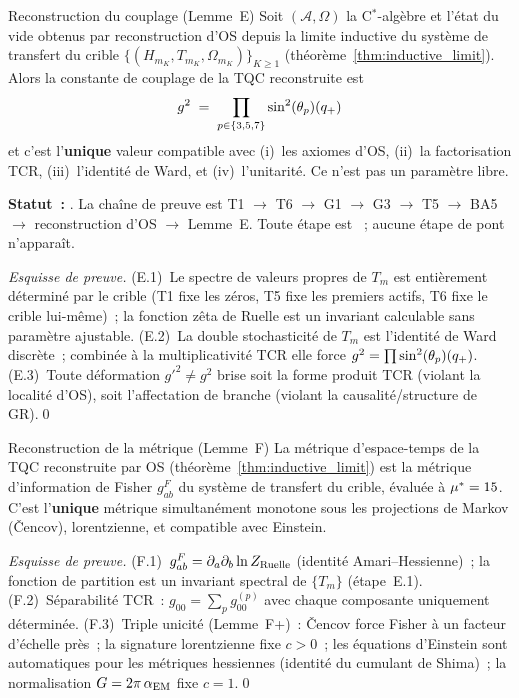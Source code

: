 \documentclass[12pt,a4paper]{article}
\begin{document}
\begin{thmbox}{Reconstruction du couplage (Lemme~E)}\mTHM
\label{thm:coupling_reconstruction}
Soit $(\mathcal{A}, \Omega)$ la C$^*$-algèbre et l'état du vide
obtenus par reconstruction d'OS depuis la limite inductive du
système de transfert du crible
$\{(H_{m_K}, T_{m_K}, \Omega_{m_K})\}_{K \geq 1}$
(théorème~\ref{thm:inductive_limit}). Alors la constante de couplage
de la TQC reconstruite est
\begin{equation}
  g^2 \;=\; \prod_{p \in \{3,5,7\}} \sin^2(\theta_{p})(q_{+})
  \label{eq:coupling_spectral}
\end{equation}
et c'est l'\textbf{unique} valeur compatible avec (i)~les axiomes
d'OS, (ii)~la factorisation TCR, (iii)~l'identité de Ward, et
(iv)~l'unitarité. Ce n'est pas un paramètre libre.

\smallskip\noindent\textbf{Statut~:} \THMTAG. La chaîne de preuve est
T1 $\to$ T6 $\to$ G1 $\to$ G3 $\to$ T5 $\to$ BA5 $\to$ reconstruction
d'OS $\to$ Lemme~E. Toute étape est \THMTAG~; aucune étape de pont
n'apparaît.
\end{thmbox}

\noindent\textit{Esquisse de preuve.}
(E.1)~Le spectre de valeurs propres de $T_m$ est entièrement
déterminé par le crible (T1 fixe les zéros, T5 fixe les premiers
actifs, T6 fixe le crible lui-même)~; la fonction zêta de Ruelle
est un invariant calculable sans paramètre ajustable.
(E.2)~La double stochasticité de $T_m$ est l'identité de Ward
discrète~; combinée à la multiplicativité TCR elle force
$g^2 = \prod \sin^2(\theta_{p})(q_{+})$.
(E.3)~Toute déformation $g'^2 \neq g^2$ brise soit la forme produit
TCR (violant la localité d'OS), soit l'affectation de branche
(violant la causalité/structure de GR).\qed

\begin{thmbox}{Reconstruction de la métrique (Lemme~F)}\mTHM
\label{thm:metric_reconstruction}
La métrique d'espace-temps de la TQC reconstruite par OS
(théorème~\ref{thm:inductive_limit}) est la métrique d'information
de Fisher $g^F_{ab}$ du système de transfert du crible, évaluée à
${\mu^{*}} = 15$. C'est l'\textbf{unique} métrique simultanément
monotone sous les projections de Markov (\v{C}encov), lorentzienne,
et compatible avec Einstein.
\end{thmbox}

\noindent\textit{Esquisse de preuve.}
(F.1)~$g^F_{ab} = \partial_a\partial_b \ln Z_{\rm Ruelle}$
(identité Amari--Hessienne)~; la fonction de partition est un
invariant spectral de $\{T_m\}$ (étape~E.1).
(F.2)~Séparabilité TCR~:
$g_{00} = \sum_p g_{00}^{(p)}$ avec chaque composante uniquement
déterminée.
(F.3)~Triple unicité (Lemme~F+)~: \v{C}encov force Fisher à un
facteur d'échelle près~; la signature lorentzienne fixe $c > 0$~;
les équations d'Einstein sont automatiques pour les métriques
hessiennes (identité du cumulant de Shima)~; la normalisation
$G = 2\pi\,\alpha_{\rm EM}$ fixe $c = 1$.\qed
\end{document}
